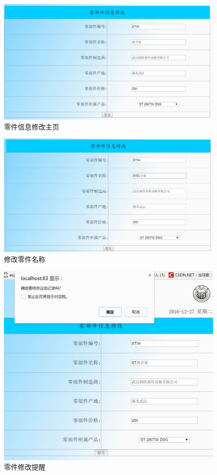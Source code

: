 \begin{figure}[H]
\centering
\includegraphics[width=0.8\linewidth]{figure/part_modify_index}
\caption{零件信息修改主页}
\label{fig:part_modify_index}
\end{figure}

\begin{figure}[H]
\centering
\includegraphics[width=0.8\linewidth]{figure/part_modify_name}
\caption{修改零件名称}
\label{fig:part_modify_name}
\end{figure}

\begin{figure}[H]
\centering
\includegraphics[width=0.8\linewidth]{figure/part_modify_alert}
\caption{零件修改提醒}
\label{fig:part_modify_alert}
\end{figure}

